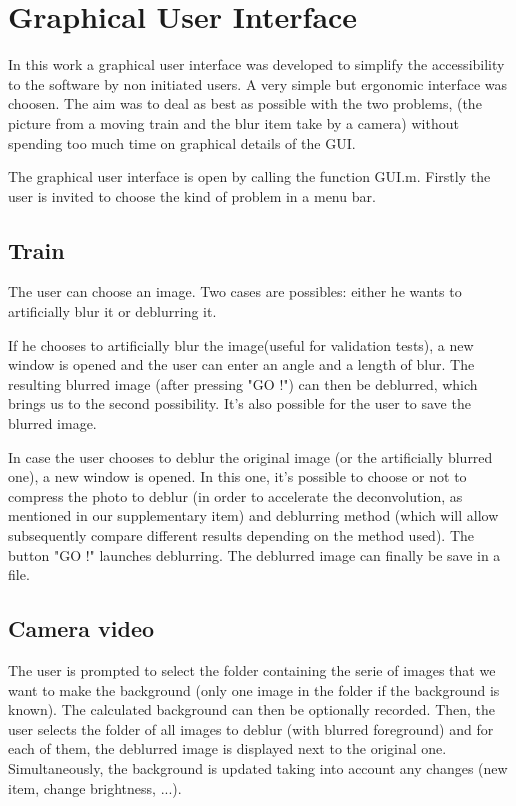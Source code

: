 
\chapter{Graphical User Interface}

In this work a graphical user interface was developed to simplify the accessibility to the software by non initiated users. A very simple but ergonomic interface was choosen. The aim was to deal as best as possible with the two problems, (the picture from a moving train and the blur item take by a camera) without spending too much time on graphical details of the GUI.


The graphical user interface is open by calling the function GUI.m. Firstly the user is invited to choose the kind of problem in a menu bar.


\section{Train}

The user can choose an image. Two cases are possibles: either he wants to artificially blur it or deblurring it. 

If he chooses to artificially blur the image(useful for validation tests), a new window is opened and the user can enter an angle and a length of blur. The resulting blurred image (after pressing "GO !") can then be deblurred, which brings us to the second possibility. It's also possible for the user to save the blurred image.

In case the user chooses to deblur the original image (or the artificially blurred one), a new window is opened. In this one, it's possible to choose or not to compress the photo to deblur (in order to accelerate the deconvolution,  as mentioned in our supplementary item) and deblurring method  (which will allow subsequently compare different results depending on the method used). The button "GO !" launches deblurring. The deblurred image can finally be save in a file.

\section{Camera video}

The user is prompted to select the folder containing the serie of images that we want to make the background (only one image in the folder if the background is known). The calculated background can then be optionally recorded.
Then, the user selects the folder of all images to deblur (with blurred foreground) and for each of them, the deblurred image is displayed next to the original one. Simultaneously, the background is updated taking into account any changes (new item, change brightness, ...).

